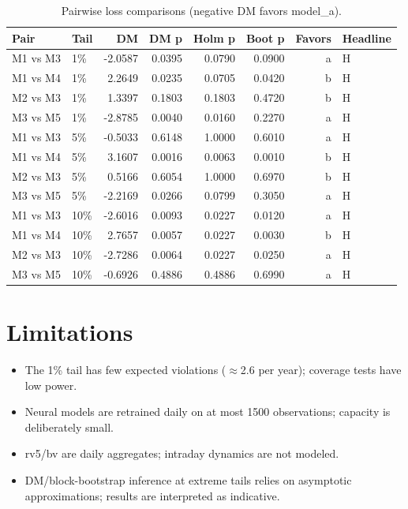 \documentclass[11pt]{article}
\begin{document}
\begin{table}[ht]
\centering
\caption{Pairwise loss comparisons (negative DM favors model\_a).}\label{tab:dm}
\footnotesize\begin{tabular}{llrrrrrl}
\hline
\textbf{Pair} & \textbf{Tail} & \textbf{DM} & \textbf{DM p} & \textbf{Holm p} & \textbf{Boot p} & \textbf{Favors} & \textbf{Headline}\\
\hline
M1 vs M3 & 1\% & -2.0587 & 0.0395 & 0.0790 & 0.0900 & a & H\\
M1 vs M4 & 1\% & 2.2649 & 0.0235 & 0.0705 & 0.0420 & b & H\\
M2 vs M3 & 1\% & 1.3397 & 0.1803 & 0.1803 & 0.4720 & b & H\\
M3 vs M5 & 1\% & -2.8785 & 0.0040 & 0.0160 & 0.2270 & a & H\\
M1 vs M3 & 5\% & -0.5033 & 0.6148 & 1.0000 & 0.6010 & a & H\\
M1 vs M4 & 5\% & 3.1607 & 0.0016 & 0.0063 & 0.0010 & b & H\\
M2 vs M3 & 5\% & 0.5166 & 0.6054 & 1.0000 & 0.6970 & b & H\\
M3 vs M5 & 5\% & -2.2169 & 0.0266 & 0.0799 & 0.3050 & a & H\\
M1 vs M3 & 10\% & -2.6016 & 0.0093 & 0.0227 & 0.0120 & a & H\\
M1 vs M4 & 10\% & 2.7657 & 0.0057 & 0.0227 & 0.0030 & b & H\\
M2 vs M3 & 10\% & -2.7286 & 0.0064 & 0.0227 & 0.0250 & a & H\\
M3 vs M5 & 10\% & -0.6926 & 0.4886 & 0.4886 & 0.6990 & a & H\\
\hline
\end{tabular}
\end{table}

\section{Limitations}
\begin{itemize}
\item The 1\% tail has few expected violations ($\approx$2.6 per year); coverage tests have low power.
\item Neural models are retrained daily on at most 1500 observations; capacity is deliberately small.
\item rv5/bv are daily aggregates; intraday dynamics are not modeled.
\item DM/block-bootstrap inference at extreme tails relies on asymptotic approximations; results are interpreted as indicative.
\end{itemize}
\end{document}
